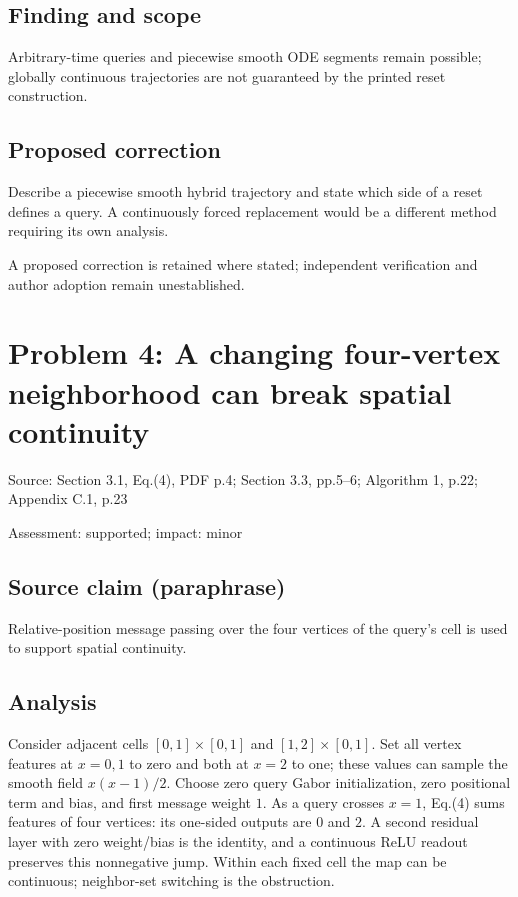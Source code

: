 \documentclass[11pt]{article}
\begin{document}
\subsection*{Finding and scope}

Arbitrary-time queries and piecewise smooth ODE segments remain possible; globally continuous trajectories are not guaranteed by the printed reset construction.

\subsection*{Proposed correction}

Describe a piecewise smooth hybrid trajectory and state which side of a reset defines a query. A continuously forced replacement would be a different method requiring its own analysis.

A proposed correction is retained where stated; independent verification and author adoption remain unestablished.

\section*{Problem 4: A changing four-vertex neighborhood can break spatial continuity}

Source: Section 3.1, Eq.(4), PDF p.4; Section 3.3, pp.5–6; Algorithm 1, p.22; Appendix C.1, p.23

Assessment: supported; impact: minor

\subsection*{Source claim (paraphrase)}

Relative-position message passing over the four vertices of the query’s cell is used to support spatial continuity.

\subsection*{Analysis}

Consider adjacent cells \([0,1]\times[0,1]\) and \([1,2]\times[0,1]\). Set all vertex features at \(x=0,1\) to zero and both at \(x=2\) to one; these values can sample the smooth field \(x(x-1)/2\). Choose zero query Gabor initialization, zero positional term and bias, and first message weight \(1\). As a query crosses \(x=1\), Eq.(4) sums features of four vertices: its one-sided outputs are \(0\) and \(2\). A second residual layer with zero weight/bias is the identity, and a continuous ReLU readout preserves this nonnegative jump. Within each fixed cell the map can be continuous; neighbor-set switching is the obstruction.
\end{document}
